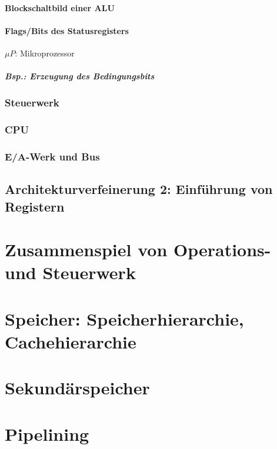 \subsubsection{Blockschaltbild einer ALU}
\subsubsection{Flags/Bits des Statusregisters}
$\mu P$: Mikroprozessor
\paragraph{Bsp.: Erzeugung des Bedingungsbits}
\subsection{Steuerwerk}
\subsection{CPU}
\subsection{E/A-Werk und Bus}

\section{Architekturverfeinerung 2: Einführung von Registern}

\chapter{Zusammenspiel von Operations- und Steuerwerk}

\chapter{Speicher: Speicherhierarchie, Cachehierarchie}

\chapter{Sekundärspeicher}

\chapter{Pipelining}

